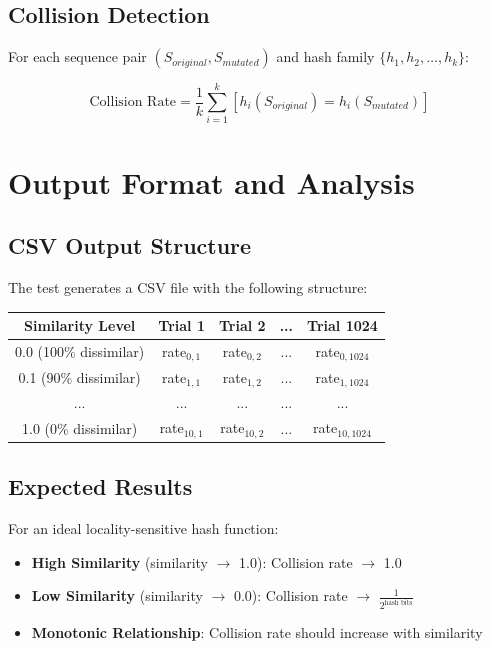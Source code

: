 \documentclass[11pt,a4paper]{article}
\begin{document}
\subsection{Collision Detection}

For each sequence pair $(S_{original}, S_{mutated})$ and hash family $\{h_1, h_2, \ldots, h_k\}$:

\begin{equation}
\text{Collision Rate} = \frac{1}{k} \sum_{i=1}^{k} [h_i(S_{original}) = h_i(S_{mutated})]
\end{equation}

\section{Output Format and Analysis}

\subsection{CSV Output Structure}

The test generates a CSV file with the following structure:

\begin{center}
\begin{tabular}{|c|c|c|c|c|}
\hline
\textbf{Similarity Level} & \textbf{Trial 1} & \textbf{Trial 2} & \textbf{...} & \textbf{Trial 1024} \\
\hline
0.0 (100\% dissimilar) & rate$_{0,1}$ & rate$_{0,2}$ & ... & rate$_{0,1024}$ \\
0.1 (90\% dissimilar) & rate$_{1,1}$ & rate$_{1,2}$ & ... & rate$_{1,1024}$ \\
... & ... & ... & ... & ... \\
1.0 (0\% dissimilar) & rate$_{10,1}$ & rate$_{10,2}$ & ... & rate$_{10,1024}$ \\
\hline
\end{tabular}
\end{center}

\subsection{Expected Results}

For an ideal locality-sensitive hash function:

\begin{itemize}
    \item \textbf{High Similarity} (similarity $\rightarrow$ 1.0): Collision rate $\rightarrow$ 1.0
    \item \textbf{Low Similarity} (similarity $\rightarrow$ 0.0): Collision rate $\rightarrow$ $\frac{1}{2^{\text{hash bits}}}$
    \item \textbf{Monotonic Relationship}: Collision rate should increase with similarity
\end{itemize}
\end{document}
